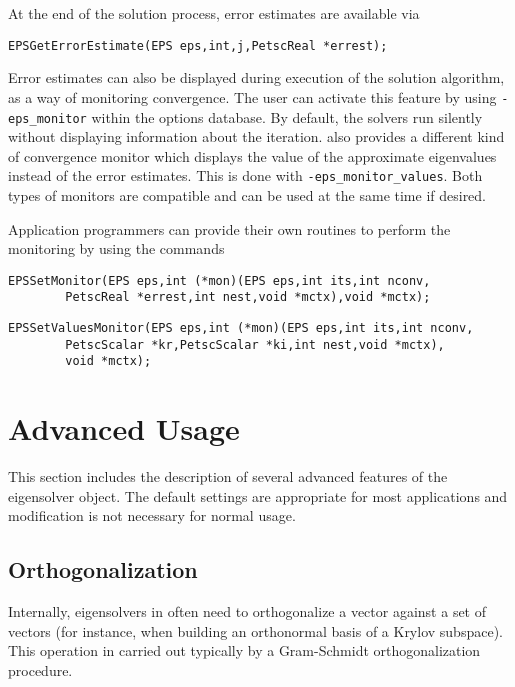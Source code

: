 	At the end of the solution process, error estimates are available via
	\begin{Verbatim}[fontsize=\small]
	EPSGetErrorEstimate(EPS eps,int,j,PetscReal *errest);
	\end{Verbatim}

	Error estimates can also be displayed during execution of the solution algorithm, as a way of monitoring convergence. The user can activate this feature by using \Verb!-eps_monitor! within the options database. By default, the solvers run silently without displaying information about the iteration. \slepc also provides a different kind of convergence monitor which displays the value of the approximate eigenvalues instead of the error estimates. This is done with \Verb!-eps_monitor_values!. Both types of monitors are compatible and can be used at the same time if desired.

	Application programmers can provide their own routines to perform the monitoring by using the commands
	 
	\begin{Verbatim}[fontsize=\small]
	EPSSetMonitor(EPS eps,int (*mon)(EPS eps,int its,int nconv,
		PetscReal *errest,int nest,void *mctx),void *mctx);
	\end{Verbatim}
	\begin{Verbatim}[fontsize=\small]
	EPSSetValuesMonitor(EPS eps,int (*mon)(EPS eps,int its,int nconv,
		PetscScalar *kr,PetscScalar *ki,int nest,void *mctx),
		void *mctx);
	\end{Verbatim}

\section{Advanced Usage}

	This section includes the description of several advanced features of the eigensolver object. The default settings are appropriate for most applications and modification is not necessary for normal usage.

\subsection{Orthogonalization}
\label{sec:orthog}

	Internally, eigensolvers in  often need to orthogonalize a vector against a set of vectors (for instance, when building an orthonormal basis of a Krylov subspace). This operation in carried out typically by a Gram-Schmidt orthogonalization procedure.


